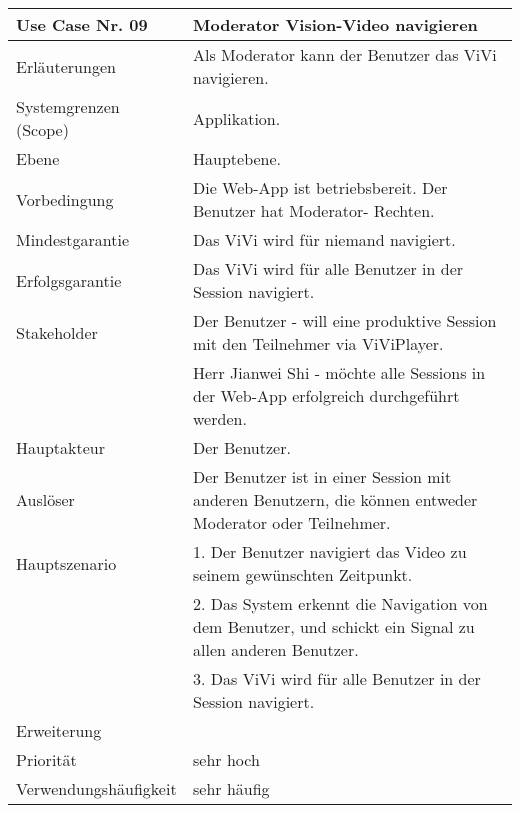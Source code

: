 \begin{tabularx}{\linewidth}{|l|X|}
	\hline
	Use Case Nr. 09			& \textbf{Moderator Vision-Video navigieren} \\ \hline
	Erläuterungen			& Als Moderator kann der Benutzer das ViVi navigieren. \\ \hline
	Systemgrenzen (Scope)	& Applikation. \\ \hline
	Ebene					& Hauptebene. \\ \hline
	Vorbedingung			& Die Web-App ist betriebsbereit. Der Benutzer hat Moderator-
							  Rechten. \\ \hline
	Mindestgarantie			& Das ViVi wird für niemand navigiert. \\ \hline
	Erfolgsgarantie			& Das ViVi wird für alle Benutzer in der Session navigiert. 
							  \\ \hline
	Stakeholder				& Der Benutzer - will eine produktive Session mit den Teilnehmer 
							  via ViViPlayer. \\
							& Herr Jianwei Shi - möchte alle Sessions in der Web-App 
							  erfolgreich durchgeführt werden. \\ \hline
	Hauptakteur				& Der Benutzer. \\ \hline
	Auslöser				& Der Benutzer ist in einer Session mit anderen Benutzern, die 
							  können entweder Moderator oder Teilnehmer. \\ \hline	
	Hauptszenario			& 1. Der Benutzer navigiert das Video zu seinem gewünschten 
							  Zeitpunkt. \\
							& 2. Das System erkennt die Navigation von dem Benutzer, und 
							  schickt ein Signal zu allen anderen Benutzer. \\ 
							& 3. Das ViVi wird für alle Benutzer in der Session navigiert. 
							\\ \hline
	Erweiterung				&  \\ \hline
	Priorität				& sehr hoch \\ \hline
	Verwendungshäufigkeit	& sehr häufig \\ \hline
\end{tabularx}